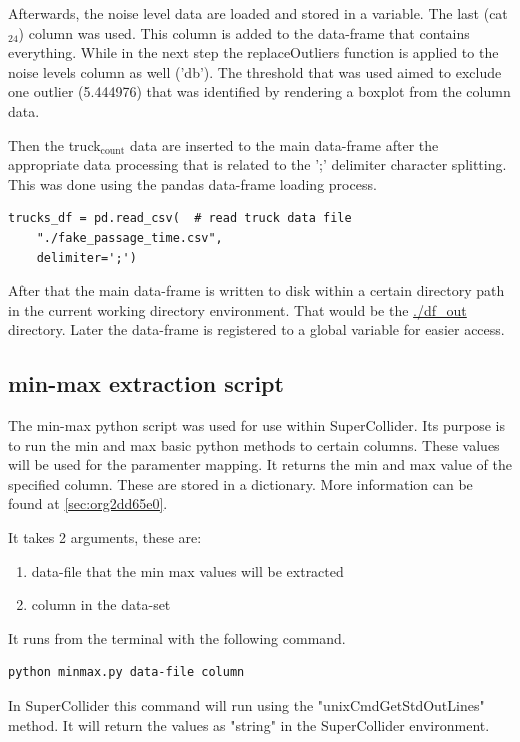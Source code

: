 \documentclass[11pt]{article}
\begin{document}
Afterwards, the noise level data are loaded and stored in a variable.  The last (cat\(_{\text{24}}\)) column was used.  This column is added to the data-frame that contains everything.  While in the next step the replaceOutliers function is applied to the noise levels column as well ('db').  The threshold that was used aimed to exclude one outlier (5.444976) that was identified by rendering a boxplot from the column data.

Then the truck\(_{\text{count}}\) data are inserted to the main data-frame after the appropriate data processing that is related to the ';' delimiter character splitting. This was done using the pandas data-frame loading process.

\begin{verbatim}
trucks_df = pd.read_csv(  # read truck data file
    "./fake_passage_time.csv",
    delimiter=';')
\end{verbatim}

After that the main data-frame is written to disk within a certain directory path in the current working directory environment.  That would be the \url{./df\_out} directory.
Later the data-frame is registered to a global variable for easier access.

\subsection{min-max extraction script}
\label{sec:orgc58e1db}
The min-max python script was used for use within SuperCollider.  Its purpose is to run the min and max basic python methods to certain columns.  These values will be used for the paramenter mapping.  It returns the min and max value of the specified column.  These are stored in a dictionary.  More information can be found at  \ref{sec:org2dd65e0}.

It takes 2 arguments, these are:
\begin{enumerate}
\item data-file that the min max values will be extracted
\item column in the data-set
\end{enumerate}

It runs from the terminal with the following command.
\begin{verbatim}
python minmax.py data-file column
\end{verbatim}

In SuperCollider this command will run using the "unixCmdGetStdOutLines" method.  It will return the values as "string" in the SuperCollider environment.
\end{document}
